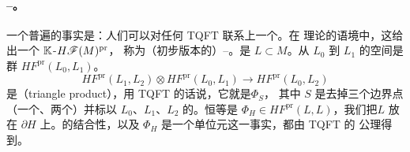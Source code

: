 \paragraph{\trDonaldson--\trFukayaCategory。}\label{sub:donaldson-fukaya-category}
一个普遍的事实是：人们可以对任何\trOpenString{} TQFT 联系上一个\trFrobenius\trCategory。在%
\trFloer{}理论的语境中，这给出一个 $\mathbb{K}$-\trLinear\trCategory{}$H\mathscr{F}(M)^{\mathrm{pr}}$，
称为（初步版本的）\trDonaldson--\trFukayaCategory。\trObject{}是\trExact\trLagrange\trSubmanifold%
$L\subset M$。从 $L_0$ 到 $L_1$ 的\trMorphism{}空间是\trFloer{}群 $HF^{\mathrm{pr}}(L_0,L_1)$。
\trComposition
\begin{equation}\label{eq:triangle-product}
HF^{\mathrm{pr}}(L_1,L_2)\otimes HF^{\mathrm{pr}}(L_0,L_1)
\longrightarrow HF^{\mathrm{pr}}(L_0,L_2)
\end{equation}
是\textbf{\trTriangleProduct}（triangle product），用 TQFT 的话说，它就是\trInvariant{}$\Phi_S$，
其中%
$S$ 是去掉三个边界点（一个\trIncomingPoint、两个\trOutgoingPoint）并标以 $L_0$、$L_1$、$L_2$
的\trDisk。恒等\trMorphism{}是 $\Phi_H\in HF^{\mathrm{pr}}(L,L)$，我们把\trLabel{}$L$ 放在
$\partial H$ 上。\trComposition{}的结合性，以及 $\Phi_H$ 是一个单位元这一事实，都由 TQFT 的%
\trGluing{}公理得到。
